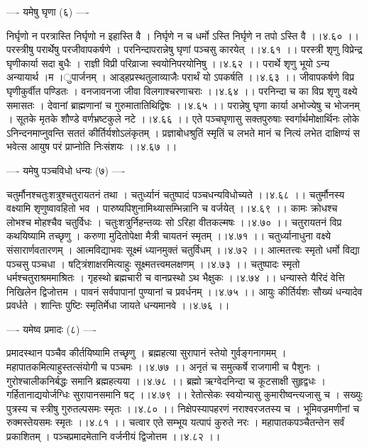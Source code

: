 \documentclass[11pt]{book}
\begin{document}
\begin{landscape}
---- यमेषु घृणा (६) ----

निर्घृणो न परत्रास्ति निर्घृणो न इहास्ति वै ।
निर्घृणे न च धर्मो ऽस्ति निर्घृणे न तपो ऽस्ति वै ।।४.६० ।।
परस्त्रीषु परार्थेषु परजीवापकर्षणे ।
परनिन्दापरान्नेषु घृणां पञ्चसु कारयेत् ।।४.६१ ।।
परस्त्री शृणु विप्रेन्द्र घृणीकार्या सदा बुधैः ।
राज्ञी विप्री परिव्राजा स्वयोनिपरयोनिषु ।।४.६२ ।।
परार्थे शृणु भूयो ऽन्य अन्यायार्थ{ ।}म{ ।}ुपार्जनम् ।
आड्हप्रस्थतुलाव्याजैः परार्थं यो ऽपकर्षति ।।४.६३ ।।
जीवापकर्षणे विप्र घृणीकुर्वीत पण्डितः ।
वनजावनजा जीवा विलगाश्चरणाचराः ।।४.६४ ।।
परनिन्दा च का विप्र शृणु वक्ष्ये समासतः ।
देवानां ब्राह्मणानां च गुरुमातातिथिद्विषः ।।४.६५ ।।
परान्नेषु घृणा कार्या अभोज्येषु च भोजनम् ।
सूतके मृतके शौण्डे वर्णभ्रष्टकुले नटे ।।४.६६ ।।
एते पञ्चघृणासु सक्तपुरुषाः स्वर्गार्थमोक्षार्थिनः
लोके ऽनिन्दनमाप्नुवन्ति सततं कीर्तिर्यशोऽलंकृतम् ।
प्रज्ञाबोधश्रुतिं स्मृतिं च लभते मानं च नित्यं लभेत
दाक्षिण्यं स भवेत्स आयुष परं प्राप्नोति निःसंशयः ।।४.६७ ।।

---- यमेषु पञ्चविधो धन्यः (७) ----

चतुर्मौनश्चतुःशत्रुश्चतुरायतनं तथा ।
चतुर्ध्यानं चतुष्पादं पञ्चधन्यविधोच्यते ।।४.६८ ।।
चतुर्मौनस्य वक्ष्यामि शृणुष्वावहितो भव ।
पारुष्यपिशुनामिथ्यासम्भिन्नानि च वर्जयेत् ।।४.६९ ।।
कामः क्रोधश्च लोभश्च मोहश्चैव चतुर्विधः । 
चतुःशत्रुर्निहन्तव्यः सो ऽरिहा वीतकल्मषः ।।४.७० ।।
चतुरायतनं विप्र कथयिष्यामि तच्छृणु ।
करुणा मुदितोपेक्षा मैत्री चायतनं स्मृतम् ।।४.७१ ।।
चतुर्ध्यानाधुना वक्ष्ये संसारार्णवतारणम् ।
आत्मविद्याभवः सूक्ष्मं ध्यानमुक्तं चतुर्विधम् ।।४.७२ ।।
आत्मतत्त्वः स्मृतो धर्मो विद्या पञ्चसु पञ्चधा ।
षट्त्रिंशाक्षरमित्याहुः सूक्ष्मतत्त्वमलक्षणम् ।।४.७३ ।।
चतुष्पादः स्मृतो धर्मश्चतुराश्रममाश्रितः ।
गृहस्थो ब्रह्मचारी च वानप्रस्थो ऽथ भैक्षुकः ।।४.७४ ।।
धन्यास्ते यैरिदं वेत्ति निखिलेन द्विजोत्तम ।
पावनं सर्वपापानां पुण्यानां च प्रवर्धनम् ।।४.७५ ।।
आयुः कीर्तिर्यशः सौख्यं धन्यादेव प्रवर्धते ।
शान्तिः पुष्टिः स्मृतिर्मेधा जायते धन्यमानवे ।।४.७६ ।।

---- यमेष्व{ }प्रमादः (८) ----

प्रमादस्थान पञ्चैव कीर्तयिष्यामि तच्छृणु ।
ब्रह्महत्या सुरापानं स्तेयो गुर्वङ्गनागमम् ।
महापातकमित्याहुस्तत्संयोगी च पञ्चमः ।।४.७७ ।।
अनृतं च समुत्कर्षे राजगामी च पैशुनः ।
गुरोश्चालीकनिर्बद्धः समानि ब्रह्महत्यया ।।४.७८ ।।
ब्रह्मो ऋग्वेदनिन्दा च कूटसाक्षी सुहृद्वधः ।
गर्हितानाद्ययोर्जग्धिः सुरापानसमानि षट् ।।४.७९ ।।
रेतोत्सेकः स्वयोन्यासु कुमारीष्वन्त्यजासु च ।
सख्युः पुत्रस्य च स्त्रीषु गुरुतल्पसमः स्मृतः ।।४.८० ।।
निक्षेपस्यापहरणं नराश्वरजतस्य च ।
भूमिवज्रमणीनां च रुक्मस्तेयसमः स्मृतः ।।४.८१ ।।
चत्वार एते सम्भूय यत्पापं कुरुते नरः ।
महापातकपञ्चैतन्तेन सर्वं प्रकाशितम् ।
पञ्चप्रमादमेतानि वर्जनीयं द्विजोत्तम ।।४.८२ ।।


\end{landscape}
\end{document}
